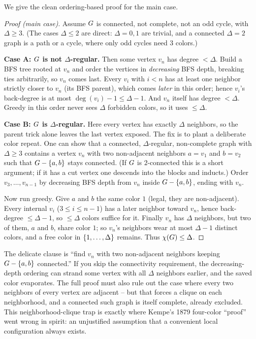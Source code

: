 We give the clean ordering-based proof for the main case.

\begin{proof}[Proof (main case)]
Assume $G$ is connected, not complete, not an odd cycle, with $\Delta\ge 3$.
(The cases $\Delta\le 2$ are direct: $\Delta=0,1$ are trivial, and a connected
$\Delta=2$ graph is a path or a cycle, where only odd cycles need $3$ colors.)

\textbf{Case A: $G$ is not $\Delta$-regular.} Then some vertex $v_n$ has degree
$<\Delta$. Build a BFS tree rooted at $v_n$ and order the vertices in
\emph{decreasing} BFS depth, breaking ties arbitrarily, so $v_n$ comes last. Every
$v_i$ with $i<n$ has at least one neighbor strictly closer to $v_n$ (its BFS parent),
which comes \emph{later} in this order; hence $v_i$'s back-degree is at most
$\deg(v_i)-1\le\Delta-1$. And $v_n$ itself has degree $<\Delta$. Greedy in this
order never sees $\Delta$ forbidden colors, so it uses $\le\Delta$.

\textbf{Case B: $G$ is $\Delta$-regular.} Here every vertex has exactly $\Delta$
neighbors, so the parent trick alone leaves the last vertex exposed. The fix is to
plant a deliberate color repeat. One can show that a connected, $\Delta$-regular,
non-complete graph with $\Delta\ge3$ contains a vertex $v_n$ with two non-adjacent
neighbors $a=v_1$ and $b=v_2$ such that $G-\{a,b\}$ stays connected. (If
$G$ is $2$-connected this is a short argument; if it has a cut vertex one
descends into the blocks and inducts.) Order $v_3,\dots,v_{n-1}$ by decreasing BFS
depth from $v_n$ inside $G-\{a,b\}$, ending with $v_n$.

Now run greedy. Give $a$ and $b$ the same color $1$ (legal, they are non-adjacent).
Every internal $v_i$ ($3\le i\le n-1$) has a later neighbor toward $v_n$, hence
back-degree $\le\Delta-1$, so $\le\Delta$ colors suffice for it. Finally $v_n$ has
$\Delta$ neighbors, but two of them, $a$ and $b$, share color $1$; so $v_n$'s
neighbors wear at most $\Delta-1$ distinct colors, and a free color in
$\{1,\dots,\Delta\}$ remains. Thus $\chi(G)\le\Delta$.
\end{proof}

\begin{trapbox}
The delicate clause is ``find $v_n$ with two non-adjacent neighbors keeping
$G-\{a,b\}$ connected.'' If you skip the connectivity requirement, the
decreasing-depth ordering can strand some vertex with all $\Delta$ neighbors
earlier, and the saved color evaporates. The full proof must also rule out the case
where every two neighbors of every vertex are adjacent -- but that forces a clique
on each neighborhood, and a connected such graph is itself complete, already
excluded. This neighborhood-clique trap is exactly where Kempe's 1879 four-color
``proof'' went wrong in spirit: an unjustified assumption that a convenient local
configuration always exists.
\end{trapbox}

